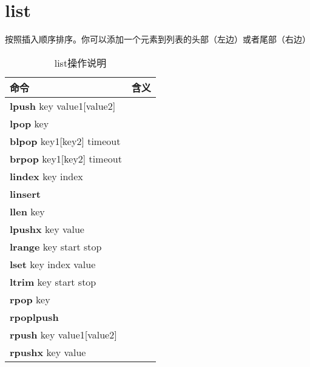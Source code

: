 \documentclass[UTF8,a4paper,12pt]{ctexbook}
\begin{document}
	\section{list}
		按照插入顺序排序。你可以添加一个元素到列表的头部（左边）或者尾部（右边）
		
		\begin{table}[H]
			\centering
			\caption{list操作说明}
			\begin{tabular}{p{5cm}<{\centering} | p{10cm}<{\centering}}
				\toprule
					命令 &  含义 \\
				\midrule
					\textbf{lpush} key value1[value2] &  	\\
					\textbf{lpop} key & 		\\
					\textbf{blpop} key1[key2] timeout &		\\
					\textbf{brpop} key1[key2] timeout &		\\
					\textbf{lindex} key index &		\\
					\textbf{linsert}  &		\\
				    \textbf{llen} key & 		\\
					\textbf{lpushx} key value & 		\\
					\textbf{lrange} key start stop & 		\\
					\textbf{lset} key index value &		\\
					\textbf{ltrim} key start stop & 		\\
					\textbf{rpop} key & 		\\
					\textbf{rpoplpush}  & 		\\
					\textbf{rpush} key value1[value2] & 		\\
					\textbf{rpushx} key value & 		\\
				\bottomrule
			\end{tabular}
		\end{table}
		
\end{document}
